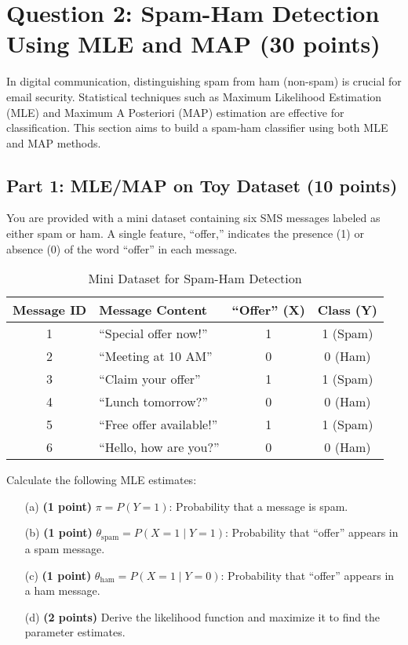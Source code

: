 \documentclass{article}
\begin{document}
\section*{Question 2: Spam-Ham Detection Using MLE and MAP (30 points)}
In digital communication, distinguishing spam from ham (non-spam) is crucial for email security. Statistical techniques such as Maximum Likelihood Estimation (MLE) and Maximum A Posteriori (MAP) estimation are effective for classification. This section aims to build a spam-ham classifier using both MLE and MAP methods.

\subsection*{Part 1: MLE/MAP on Toy Dataset (10 points)}
You are provided with a mini dataset containing six SMS messages labeled as either spam or ham. A single feature, ``offer,'' indicates the presence (1) or absence (0) of the word ``offer'' in each message.

\begin{table}[h!]
    \centering
    \begin{tabular}{|c|l|c|c|}
        \hline
        \textbf{Message ID} & \textbf{Message Content} & \textbf{``Offer'' (X)} & \textbf{Class (Y)} \\
        \hline
        1 & ``Special offer now!'' & 1 & 1 (Spam) \\
        2 & ``Meeting at 10 AM'' & 0 & 0 (Ham) \\
        3 & ``Claim your offer'' & 1 & 1 (Spam) \\
        4 & ``Lunch tomorrow?'' & 0 & 0 (Ham) \\
        5 & ``Free offer available!'' & 1 & 1 (Spam) \\
        6 & ``Hello, how are you?'' & 0 & 0 (Ham) \\
        \hline
    \end{tabular}
    \caption{Mini Dataset for Spam-Ham Detection}
\end{table}

\noindent Calculate the following MLE estimates:
\begin{itemize}
    \item[(a)] \textbf{(1 point)} $\pi = P(Y = 1)$: Probability that a message is spam.
    \item[(b)] \textbf{(1 point)} $\theta_{\text{spam}} = P(X = 1 \mid Y = 1)$: Probability that ``offer'' appears in a spam message.
    \item[(c)] \textbf{(1 point)} $\theta_{\text{ham}} = P(X = 1 \mid Y = 0)$: Probability that ``offer'' appears in a ham message.
    \item[(d)] \textbf{(2 points)} Derive the likelihood function and maximize it to find the parameter estimates. 
\end{itemize}
\end{document}
